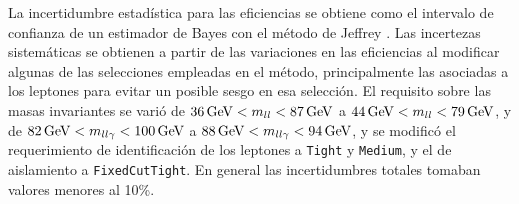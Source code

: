 La incertidumbre estadística para las eficiencias se obtiene como el intervalo de confianza de un estimador de Bayes con el método de Jeffrey \cite{jeffrey}.
Las incertezas sistemáticas se obtienen a partir de las variaciones en las eficiencias al modificar algunas de las selecciones empleadas en el método, principalmente las asociadas a los leptones para evitar un posible sesgo en esa selección. El requisito sobre las masas invariantes se varió de $36\,\text{GeV}<m_{ll}<87\,\text{GeV}$ a $44\,\text{GeV}<m_{ll}<79\,\text{GeV}$, y de 
$82\,\text{GeV}<m_{ll\gamma}<100\,\text{GeV}$ a $88\,\text{GeV}<m_{ll\gamma}<94\,\text{GeV}$, y se modificó el requerimiento de identificación de los leptones a \texttt{Tight} y \texttt{Medium}, y el de aislamiento a \texttt{FixedCutTight}. En general las incertidumbres totales tomaban valores menores al 10\%.





